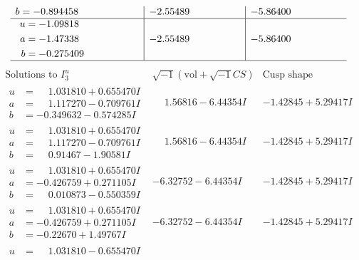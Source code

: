 \documentclass[1p]{elsarticle_modified}
\theoremstyle{definition}
\newcommand{\I}{\sqrt{-1}}
\begin{document}
$$\begin{array}{c|c|c}
\begin{aligned}
b &= -0.894458\phantom{ +0.000000I}\end{aligned}
 & -2.55489\phantom{ +0.000000I} & -5.86400\phantom{ +0.000000I} \\ \hline\begin{aligned}
u &= -1.09818\phantom{ +0.000000I} \\
a &= -1.47338\phantom{ +0.000000I} \\
b &= -0.275409\phantom{ +0.000000I}\end{aligned}
 & -2.55489\phantom{ +0.000000I} & -5.86400\phantom{ +0.000000I}\\
 \hline 
 \end{array}$$\newpage$$\begin{array}{c|c|c}  
\text{Solutions to }I^u_{3}& \I (\text{vol} + \sqrt{-1}CS) & \text{Cusp shape}\\
 \hline 
\begin{aligned}
u &= \phantom{-}1.031810 + 0.655470 I \\
a &= \phantom{-}1.117270 - 0.709761 I \\
b &= -0.349632 - 0.574285 I\end{aligned}
 & \phantom{-}1.56816 - 6.44354 I & -1.42845 + 5.29417 I \\ \hline\begin{aligned}
u &= \phantom{-}1.031810 + 0.655470 I \\
a &= \phantom{-}1.117270 - 0.709761 I \\
b &= \phantom{-}0.91467 - 1.90581 I\end{aligned}
 & \phantom{-}1.56816 - 6.44354 I & -1.42845 + 5.29417 I \\ \hline\begin{aligned}
u &= \phantom{-}1.031810 + 0.655470 I \\
a &= -0.426759 + 0.271105 I \\
b &= \phantom{-}0.010873 - 0.550359 I\end{aligned}
 & -6.32752 - 6.44354 I & -1.42845 + 5.29417 I \\ \hline\begin{aligned}
u &= \phantom{-}1.031810 + 0.655470 I \\
a &= -0.426759 + 0.271105 I \\
b &= -0.22670 + 1.49767 I\end{aligned}
 & -6.32752 - 6.44354 I & -1.42845 + 5.29417 I \\ \hline\begin{aligned}
u &= \phantom{-}1.031810 - 0.655470 I \\

\end{aligned}
\end{array}$$
\end{document}
